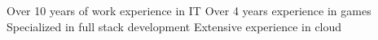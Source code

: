 \documentclass[9pt]{developercv} %
\begin{document}
\vspace{0.5cm}



\begin{minipage}[t]{0.4\textwidth} %
	\vspace{-\baselineskip} %
	Over 10 years of work experience in IT\newline\newline
    Over 4 years experience in games\newline\newline
    Specialized in full stack development\newline\newline
    Extensive experience in cloud\newline\newline
\end{minipage}
\hfill %
\begin{minipage}[t]{0.5\textwidth} %
	\vspace{-\baselineskip} %
	\begin{barchart}{5.5}
	\end{barchart}
\end{minipage}


\end{document}
